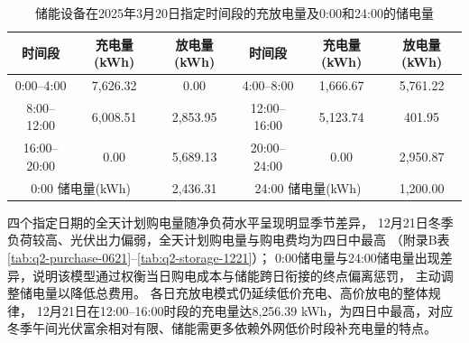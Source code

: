 \begin{table}[H]
  \centering
  \caption{储能设备在2025年3月20日指定时间段的充放电量及0:00和24:00的储电量}
  \label{tab:q2-storage-0320-main}
  \small
  \renewcommand{\arraystretch}{1.3}
  \begin{tabular}{|c|c|c|c|c|c|}
    \hline
    时间段 & 充电量(kWh) & 放电量(kWh)
    & 时间段 & 充电量(kWh) & 放电量(kWh) \\
    \hline
    0:00--4:00 & 7{,}626.32 & 0.00
    & 4:00--8:00 & 1{,}666.67 & 5{,}761.22 \\
    \hline
    8:00--12:00 & 6{,}008.51 & 2{,}853.95
    & 12:00--16:00 & 5{,}123.74 & 401.95 \\
    \hline
    16:00--20:00 & 0.00 & 5{,}689.13
    & 20:00--24:00 & 0.00 & 2{,}950.87 \\
    \hline
    \multicolumn{2}{|c|}{0:00 储电量(kWh)}
    & \multicolumn{1}{c|}{2{,}436.31}
    & \multicolumn{2}{c|}{24:00 储电量(kWh)}
    & \multicolumn{1}{c|}{1{,}200.00} \\
    \hline
  \end{tabular}
\end{table}
四个指定日期的全天计划购电量随净负荷水平呈现明显季节差异，
12月21日冬季负荷较高、光伏出力偏弱，全天计划购电量与购电费均为四日中最高
（附录B表\ref{tab:q2-purchase-0621}--\ref{tab:q2-storage-1221}）；
0:00储电量与24:00储电量出现差异，说明该模型通过权衡当日购电成本与储能跨日衔接的终点偏离惩罚，
主动调整储电量以降低总费用。
各日充放电模式仍延续低价充电、高价放电的整体规律，
12月21日在12:00--16:00时段的充电量达8{,}256.39 kWh，为四日中最高，对应冬季午间光伏富余相对有限、储能需更多依赖外网低价时段补充电量的特点。

